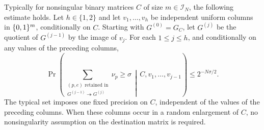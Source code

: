 \begin{proposition}\label{prop:retention-cost}
Typically for nonsingular binary matrices \(C\) of size
\(m\in\mathcal I_N\), the following estimate holds. Let \(h\in\{1,2\}\)
and let \(v_1,\ldots,v_h\) be independent uniform columns in
\(\{0,1\}^m\), conditionally on \(C\). Starting with \(G^{(0)}=G_C\),
let \(G^{(j)}\) be the quotient of \(G^{(j-1)}\) by the image of
\(v_j\). For each \(1\le j\le h\), and conditionally on any values
of the preceding columns,
\begin{equation}\label{eq:retention-cost}
 \Pr\!\left(
  \sum_{\substack{(p,e)\text{ retained in}\\
                  G^{(j-1)}\twoheadrightarrow G^{(j)}}}\nu_p
       \ge\sigma
       \,\middle|\, C,v_1,\ldots,v_{j-1}\right)
 \le 2^{-N\sigma/2}.
\end{equation}
The typical set imposes one fixed precision on \(C\), independent of
the values of the preceding columns. When these columns occur in a
random enlargement of \(C\), no nonsingularity assumption on the
destination matrix is required.
\end{proposition}

